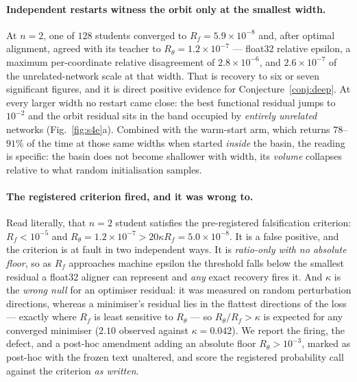 \documentclass[10pt,twocolumn,letterpaper]{article}
\theoremstyle{definition}
\begin{document}
\paragraph{Independent restarts witness the orbit only at the smallest width.} At $n=2$, one of
$128$ students converged to $R_f = 5.9\times10^{-8}$ and, after optimal alignment, agreed with its
teacher to $R_\theta = 1.2\times10^{-7}$ --- float32 relative epsilon, a maximum per-coordinate
relative disagreement of $2.8\times10^{-6}$, and $2.6\times10^{-7}$ of the unrelated-network scale
at that width. That is recovery to six or seven significant figures, and it is direct positive
evidence for Conjecture~\ref{conj:deep}. At every larger width no restart came close: the best
functional residual jumps to $10^{-2}$ and the orbit residual sits in the band occupied by
\emph{entirely unrelated} networks (Fig.~\ref{fig:s4e}a). Combined with the warm-start arm, which
returns $78$--$91\%$ of the time at those same widths when started \emph{inside} the basin, the
reading is specific: the basin does not become shallower with width, its \emph{volume} collapses
relative to what random initialisation samples.

\paragraph{The registered criterion fired, and it was wrong to.} Read literally, that $n=2$ student
satisfies the pre-registered falsification criterion: $R_f < 10^{-5}$ and
$R_\theta = 1.2\times10^{-7} > 20\kappa R_f = 5.0\times10^{-8}$. It is a false positive, and the
criterion is at fault in two independent ways. It is \emph{ratio-only with no absolute floor}, so
as $R_f$ approaches machine epsilon the threshold falls below the smallest residual a float32
aligner can represent and \emph{any} exact recovery fires it. And $\kappa$ is the \emph{wrong null}
for an optimiser residual: it was measured on random perturbation directions, whereas a minimiser's
residual lies in the flattest directions of the loss --- exactly where $R_f$ is least sensitive to
$R_\theta$ --- so $R_\theta/R_f > \kappa$ is expected for any converged minimiser ($2.10$ observed
against $\kappa = 0.042$). We report the firing, the defect, and a post-hoc amendment adding an
absolute floor $R_\theta > 10^{-3}$, marked as post-hoc with the frozen text unaltered, and score
the registered probability call against the criterion \emph{as written}.
\end{document}
